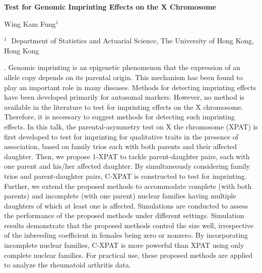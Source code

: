 \documentclass[12pt]{article}
\begin{document}
\begin{flushleft}


{\LARGE\bf Test for Genomic Imprinting Effects on the X Chromosome}


\vspace{1.0cm}

Wing Kam Fung$^1$ %

\begin{description}

\item $^1 \;$ Department of Statistics and Actuarial Science, The University of Hong Kong, Hong Kong


\end{description}

\end{flushleft}


\vspace{0.75cm}

. Genomic imprinting is an epigenetic phenomenon that the expression of an allele copy depends on its parental origin. This mechanism has been found to play an important role in many diseases. Methods for detecting imprinting effects have been developed primarily for autosomal markers. However, no method is available in the literature to test for imprinting effects on the X chromosome. Therefore, it is necessary to suggest methods for detecting such imprinting effects. In this talk, the parental-asymmetry test on X the chromosome (XPAT) is first developed to test for imprinting for qualitative traits in the presence of association, based on family trios each with both parents and their affected daughter. Then, we propose 1-XPAT to tackle parent-daughter pairs, each with one parent and his/her affected daughter. By simultaneously considering family trios and parent-daughter pairs, C-XPAT is constructed to test for imprinting. Further, we extend the proposed methods to accommodate complete (with both parents) and incomplete (with one parent) nuclear families having multiple daughters of which at least one is affected. Simulations are conducted to assess the performance of the proposed methods under different settings. Simulation results demonstrate that the proposed methods control the size well, irrespective of the inbreeding coefficient in females being zero or nonzero. By incorporating incomplete nuclear families, C-XPAT is more powerful than XPAT using only complete nuclear families. For practical use, these proposed methods are applied to analyze the rheumatoid arthritis data.
\end{document}
